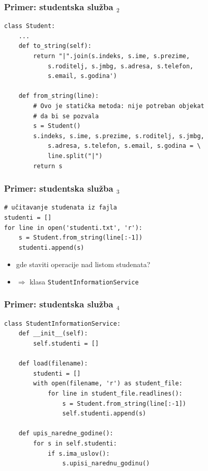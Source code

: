\documentclass[utf8,compress]{beamer}
\begin{document}
\begin{frame}[fragile,shrink=10]
  \frametitle{Primer: studentska služba $_2$}
\begin{verbatim}
class Student:
    ...
    def to_string(self):
        return "|".join(s.indeks, s.ime, s.prezime, 
            s.roditelj, s.jmbg, s.adresa, s.telefon, 
            s.email, s.godina')
    
    def from_string(line):
        # Ovo je statička metoda: nije potreban objekat 
        # da bi se pozvala
        s = Student()
        s.indeks, s.ime, s.prezime, s.roditelj, s.jmbg, 
            s.adresa, s.telefon, s.email, s.godina = \
            line.split("|")
        return s
\end{verbatim}
\end{frame}

\begin{frame}[fragile]
  \frametitle{Primer: studentska služba $_3$}
\begin{verbatim}
# učitavanje studenata iz fajla
studenti = []
for line in open('studenti.txt', 'r'):
    s = Student.from_string(line[:-1])
    studenti.append(s)
\end{verbatim}
  \begin{itemize}
    \item gde staviti operacije nad listom studenata?
    \item $\Rightarrow$ klasa \texttt{StudentInformationService}
  \end{itemize}
\end{frame}

\begin{frame}[fragile]
  \frametitle{Primer: studentska služba $_4$}
\begin{verbatim}
class StudentInformationService:
    def __init__(self):
        self.studenti = []

    def load(filename):
        studenti = []
        with open(filename, 'r') as student_file:
            for line in student_file.readlines():
                s = Student.from_string(line[:-1])
                self.studenti.append(s)

    def upis_naredne_godine():
        for s in self.studenti:
            if s.ima_uslov():
                s.upisi_narednu_godinu()
\end{verbatim}
\end{frame}
\end{document}
